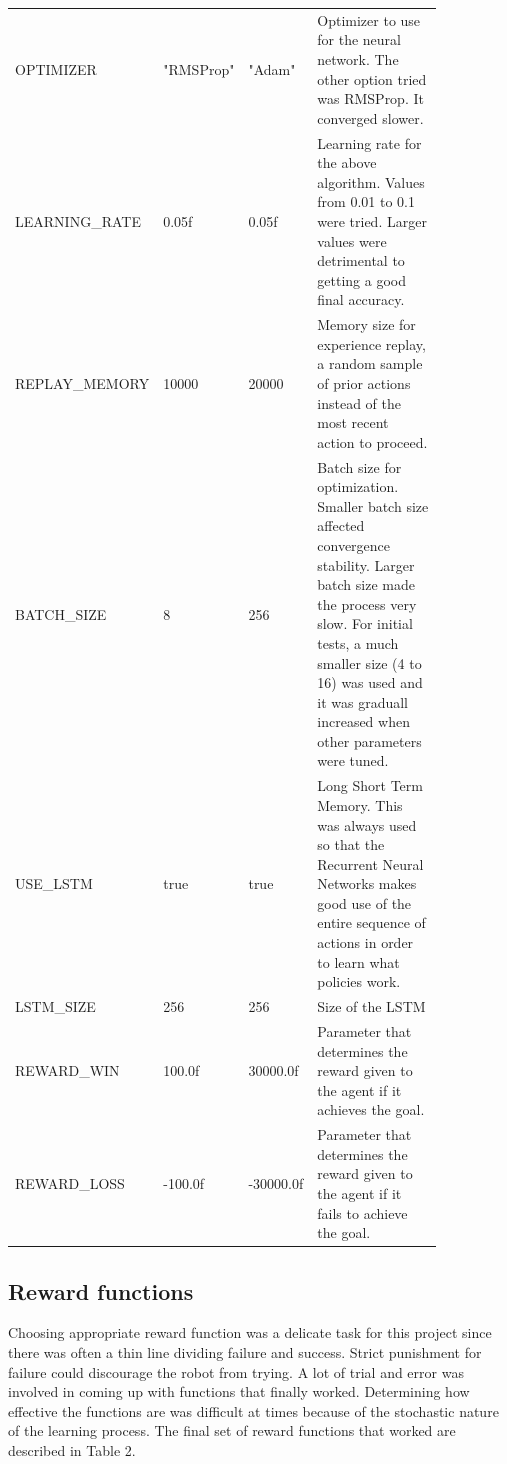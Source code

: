 \documentclass[10pt,journal,compsoc]{IEEEtran}
\begin{document}
\begin{table}[ht]
\begin{tabular}{p{0.2\linewidth}p{0.15\linewidth}p{0.15\linewidth}p{0.35\linewidth}}
OPTIMIZER & "RMSProp" & "Adam" & Optimizer to use for the neural network. The other option tried was RMSProp. It converged slower.\\
LEARNING\_RATE & 0.05f & 0.05f & Learning rate for the above algorithm. Values from 0.01 to 0.1 were tried. Larger values were detrimental to getting a good final accuracy.\\
REPLAY\_MEMORY & 10000 & 20000 & Memory size for experience replay, a random sample of prior actions instead of the most recent action to proceed. \\
BATCH\_SIZE & 8 & 256 & Batch size for optimization. Smaller batch size affected convergence stability. Larger batch size made the process very slow. For initial tests, a much smaller size (4 to 16) was used and it was graduall increased when other parameters were tuned.\\
USE\_LSTM & true & true & Long Short Term Memory. This was always used so that the Recurrent Neural Networks makes good use of the entire sequence of actions in order to learn what policies work.\\
LSTM\_SIZE & 256 & 256 & Size of the LSTM\\
REWARD\_WIN & 100.0f & 30000.0f & Parameter that determines the reward given to the agent if it achieves the goal.\\
REWARD\_LOSS & -100.0f & -30000.0f & Parameter that determines the reward given to the agent if it fails to achieve the goal.\\
\hline
\end{tabular}
\end{table}

\subsection{Reward functions}

Choosing appropriate reward function was a delicate task for this project since there was often a thin line dividing failure and success. Strict punishment for failure could discourage the robot from trying. A lot of trial and error was involved in coming up with functions that finally worked. Determining how effective the functions are was difficult at times because of the stochastic nature of the learning process. The final set of reward functions that worked are described in Table 2. 
\end{document}

